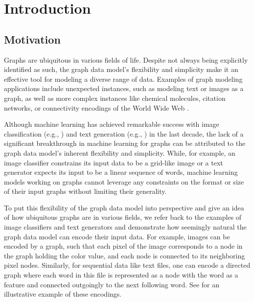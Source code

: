 \section{Introduction}
\subsection{Motivation}
Graphs are ubiquitous in various fields of life. Despite not always being explicitly identified as such, the graph data model's flexibility and simplicity make it an effective tool for modeling a diverse range of data. Examples of graph modeling applications include unexpected instances, such as modeling text or images as a graph, as well as more complex instances like chemical molecules, citation networks, or connectivity encodings of the World Wide Web \cite{Mor+2020, Sca+2009}.

Although machine learning has achieved remarkable success with image classification (e.g., \cite{Zoph2018, He2016}) and text generation (e.g., \cite{Radford2019, Brown2020}) in the last decade, the lack of a significant breakthrough in machine learning for graphs can be attributed to the graph data model's inherent flexibility and simplicity. While, for example, an image classifier constrains its input data to be a grid-like image or a text generator expects its input to be a linear sequence of words, machine learning models working on graphs cannot leverage any constraints on the format or size of their input graphs without limiting their generality. 

To put this flexibility of the graph data model into perspective and give an idea of how ubiquitous graphs are in various fields, we refer back to the examples of image classifiers and text generators and demonstrate how seemingly natural the graph data model can encode their input data. For example, images can be encoded by a graph, such that each pixel of the image corresponds to a node in the graph holding the color value, and each node is connected to its neighboring pixel nodes. Similarly, for sequential data like text files, one can encode a directed graph where each word in this file is represented as a node with the word as a feature and connected outgoingly to the next following word. See  for an illustrative example of these encodings.

